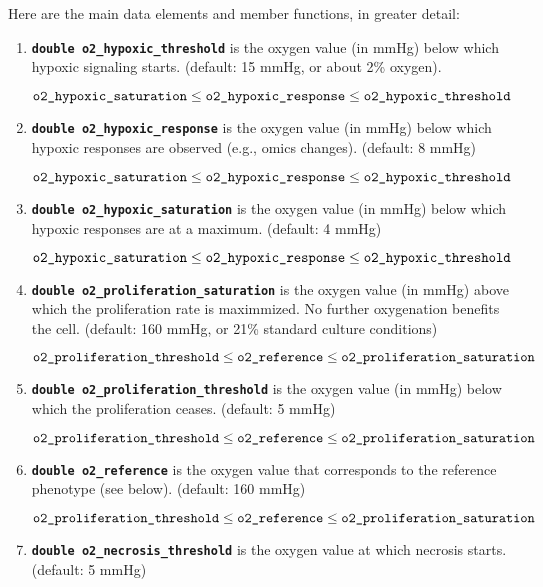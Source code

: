 \documentclass[12pt]{article}
\newcommand{\smallcode}[1]{\textbf{\texttt{#1}}}
\begin{document}
Here are the main data elements and member functions, in greater detail: 

\begin{enumerate}
\item 
\smallcode{double o2\_hypoxic\_threshold} is the oxygen value (in mmHg) 
below which hypoxic signaling starts. (default: 15 mmHg, or about 2\% oxygen).  

$$
\verb|o2_hypoxic_saturation| \le \verb|o2_hypoxic_response| \le \verb|o2_hypoxic_threshold|
$$

\item 
\smallcode{double o2\_hypoxic\_response} is the oxygen value (in mmHg) 
below which hypoxic responses are observed (e.g., omics changes). 
(default: 8 mmHg) 

$$
\verb|o2_hypoxic_saturation| \le \verb|o2_hypoxic_response| \le \verb|o2_hypoxic_threshold|
$$

\item 
\smallcode{double o2\_hypoxic\_saturation} is the oxygen value (in mmHg) 
below which hypoxic responses are at a maximum. 
(default: 4 mmHg) 

$$
\verb|o2_hypoxic_saturation| \le \verb|o2_hypoxic_response| \le \verb|o2_hypoxic_threshold|
$$


\item 
\smallcode{double o2\_proliferation\_saturation} is the oxygen value (in mmHg) 
above which the proliferation rate is maximmized. No further 
oxygenation benefits the cell. (default: 160 mmHg, or 21\% standard culture conditions)

$$
\verb|o2_proliferation_threshold| \le \verb|o2_reference| \le \verb|o2_proliferation_saturation|
$$

\item 
\smallcode{double o2\_proliferation\_threshold} is the oxygen value (in mmHg) 
below which the proliferation ceases. (default: 5 mmHg)

$$
\verb|o2_proliferation_threshold| \le \verb|o2_reference| \le \verb|o2_proliferation_saturation|
$$

\item 
\smallcode{double o2\_reference} is the oxygen value that corresponds to the 
reference phenotype (see below). (default: 160 mmHg) 

$$
\verb|o2_proliferation_threshold| \le \verb|o2_reference| \le \verb|o2_proliferation_saturation|
$$

\item 
\smallcode{double o2\_necrosis\_threshold} is the oxygen value at which 
necrosis starts. (default: 5 mmHg) 


\end{enumerate}
\end{document}
